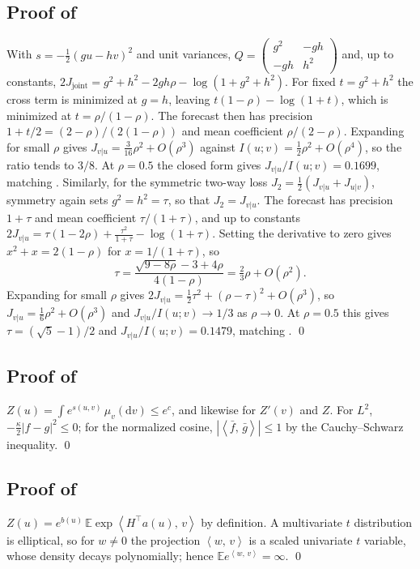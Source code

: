\documentclass[11pt]{article}
\theoremstyle{plain}
\theoremstyle{definition}
\theoremstyle{remark}
\newcommand{\E}{\mathbb{E}}
\newcommand{\Dd}{\mathrm{d}}
\newcommand{\IP}[2]{\left\langle #1,\, #2 \right\rangle}
\newcommand{\abs}[1]{\left\lvert #1 \right\rvert}
\newcommand{\Jvu}{J_{v\vert u}}
\newcommand{\Juv}{J_{u\vert v}}
\newcommand{\Jtwo}{J_{2}}
\newcommand{\Jjoint}{J_{\mathrm{joint}}}
\begin{document}
\subsection{Proof of \texorpdfstring{}{Proposition 3.7}}
\label{app:scalar}
With $s=-\tfrac12(gu-hv)^{2}$ and unit variances,
$Q=\begin{pmatrix}g^{2}&-gh\\-gh&h^{2}\end{pmatrix}$ and, up to constants,
$2\Jjoint=g^{2}+h^{2}-2gh\rho-\log(1+g^{2}+h^{2})$. For fixed $t=g^{2}+h^{2}$
the cross term is minimized at $g=h$, leaving $t(1-\rho)-\log(1+t)$, which is
minimized at $t=\rho/(1-\rho)$. The forecast then has precision
$1+t/2=(2-\rho)/(2(1-\rho))$ and mean coefficient $\rho/(2-\rho)$. Expanding
for small $\rho$ gives $\Jvu=\tfrac{3}{16}\rho^{2}+O(\rho^{3})$ against
$I(u;v)=\tfrac12\rho^{2}+O(\rho^{4})$, so the ratio tends to $3/8$. At
$\rho=0.5$ the closed form gives $\Jvu/I(u;v)=0.1699$, matching .
Similarly, for the symmetric two-way loss $\Jtwo=\tfrac12(\Jvu+\Juv)$, symmetry
again sets $g^{2}=h^{2}=\tau$, so that $\Jtwo=\Jvu$. The forecast has precision
$1+\tau$ and mean coefficient $\tau/(1+\tau)$, and up to constants
$2\Jvu=\tau(1-2\rho)+\frac{\tau^{2}}{1+\tau}-\log(1+\tau)$. Setting the
derivative to zero gives $x^{2}+x=2(1-\rho)$ for $x=1/(1+\tau)$, so
\[
 \tau=\frac{\sqrt{9-8\rho}-3+4\rho}{4(1-\rho)}=\tfrac23\rho+O(\rho^{2}).
\]
Expanding for small $\rho$ gives
$2\Jvu=\tfrac12\tau^{2}+(\rho-\tau)^{2}+O(\rho^{3})$, so
$\Jvu=\tfrac16\rho^{2}+O(\rho^{3})$ and $\Jvu/I(u;v)\to1/3$ as $\rho\to0$. At
$\rho=0.5$ this gives $\tau=(\sqrt5-1)/2$ and $\Jvu/I(u;v)=0.1479$, matching
.
\qed

\subsection{Proof of \texorpdfstring{}{Proposition 4.1}}
\label{app:bounded}
$Z(u)=\int e^{s(u,v)}\,\mu_v(\Dd v)\le e^{c}$, and likewise for $Z'(v)$ and
$Z$. For $L^2$, $-\tfrac{\kappa}{2}\abs{f-g}^{2}\le0$; for the normalized
cosine, $\abs{\IP{\bar f}{\bar g}}\le1$ by the Cauchy--Schwarz inequality.
\qed

\subsection{Proof of \texorpdfstring{}{Proposition 4.2}}
\label{app:linear}
$Z(u)=e^{b(u)}\,\E\exp\IP{H^{\top}a(u)}{v}$ by definition. A multivariate
$t$ distribution is elliptical, so for $w\neq0$ the projection $\IP{w}{v}$ is
a scaled univariate $t$ variable, whose density decays polynomially; hence
$\E e^{\IP{w}{v}}=\infty$.
\qed
\end{document}

